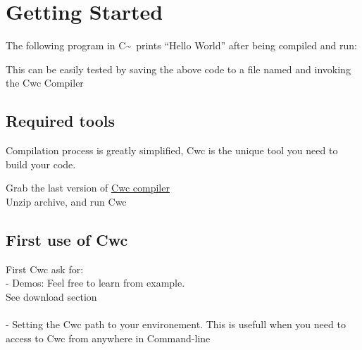 \section{Getting Started}
\label{introduction-getting-started}

The following program in C\textasciitilde\, prints ``Hello World'' after being compiled and run:


This can be easily tested  by saving the above code to a file named  and invoking the Cwc Compiler \\

\subsection{Required tools}
\label{required-tools}

Compilation process is greatly simplified, Cwc is the unique tool you need to build your code. 

Grab the last version of \href{https://github.com/VLiance/Cwc/releases}{Cwc compiler}   \\

Unzip archive, and run Cwc \\

\subsection{First use of Cwc}
\label{use-cwc}

First Cwc ask for:\\
- Demos: Feel free to learn from example. \\
See download section\\
\\
- Setting the Cwc path to your environement. This is usefull when you need to access to Cwc from anywhere in Command-line\\



